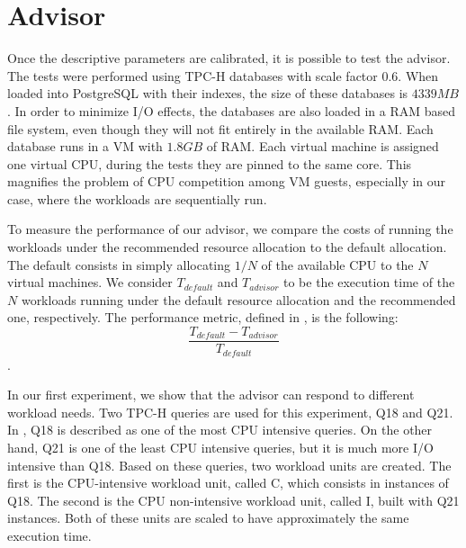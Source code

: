  \section{Advisor}
 
 Once the descriptive parameters are calibrated, it is possible to test the advisor. The tests were performed using TPC-H databases with scale factor 0.6. When loaded into PostgreSQL with their indexes, the size of these databases is $4339 MB$. In order to minimize I/O effects, the databases are also loaded  in a RAM based file system, even though they will not fit entirely in the available RAM. Each database runs in a VM with $1.8 GB$ of RAM.  Each virtual machine is assigned one virtual CPU, during the tests they are pinned to the same core. This magnifies the problem of CPU competition among VM guests, especially in our case, where the workloads are sequentially run.
 
 To measure the performance of our advisor, we compare the costs of running the workloads under the recommended resource allocation to the default allocation. The default consists in simply allocating $1/N$ of the available CPU to the $N$ virtual machines. We consider $T_{default}$ and $T_{advisor}$ to be the execution time of the $N$ workloads running under the default resource allocation and the recommended one, respectively. The performance metric, defined in \cite{Soror:2008:AVM:1376616.1376711}, is the following:
 \[
  \frac{T_{default}-T_{advisor}}{T_{default}}
 \]
.

In our first experiment, we show that the advisor can respond to different workload needs. Two TPC-H queries are used for this experiment, Q18 and Q21. In \cite{Soror:2008:AVM:1376616.1376711}, Q18 is described as one of the most CPU intensive queries. On the other hand, Q21 is one of the least CPU intensive queries, but it is much more I/O intensive than Q18. Based on these queries, two workload units are created. The first is the CPU-intensive workload unit, called C, which consists in instances of Q18. The second is the CPU non-intensive workload unit, called I, built with Q21 instances. Both of these units are scaled to have approximately the same execution time.


